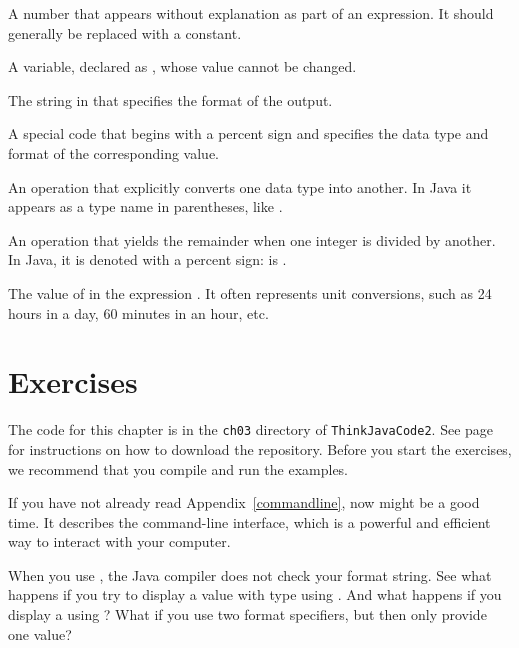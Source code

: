 \begin{description}
A number that appears without explanation as part of an expression.
It should generally be replaced with a constant.

A variable, declared as , whose value cannot be changed.

The string in  that specifies the format of the output.

A special code that begins with a percent sign and specifies the data type and format of the corresponding value.

An operation that explicitly converts one data type into another.
In Java it appears as a type name in parentheses, like .


An operation that yields the remainder when one integer is divided by another.
In Java, it is denoted with a percent sign:  is .

The value of  in the expression .
It often represents unit conversions, such as 24 hours in a day, 60 minutes in an hour, etc.

\end{description}


\section{Exercises}

The code for this chapter is in the {\tt ch03} directory of {\tt ThinkJavaCode2}.
See page~\pageref{code} for instructions on how to download the repository.
Before you start the exercises, we recommend that you compile and run the examples.

If you have not already read Appendix~\ref{commandline}, now might be a good time.
It describes the command-line interface, which is a powerful and efficient way to interact with your computer.


\begin{exercise}  %

When you use , the Java compiler does not check your format string.
See what happens if you try to display a value with type  using .
And what happens if you display a  using ?
What if you use two format specifiers, but then only provide one value?

\end{exercise}

